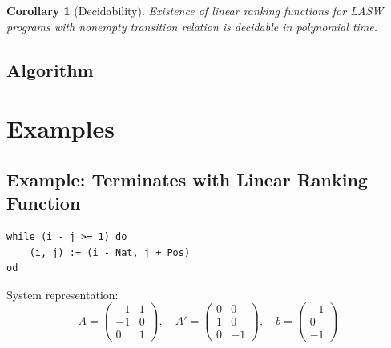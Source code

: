 \documentclass{article}
\newtheorem{corollary}{Corollary}
\begin{document}
\begin{corollary}[Decidability]
Existence of linear ranking functions for LASW programs with nonempty transition relation is decidable in polynomial time.
\end{corollary}

\subsection{Algorithm}

\begin{figure}[h]
\centering
{}
\end{figure}

\section{Examples}

\subsection{Example: Terminates with Linear Ranking Function}

\begin{verbatim}
while (i - j >= 1) do
    (i, j) := (i - Nat, j + Pos)
od
\end{verbatim}

System representation:
\begin{equation}
A = \begin{pmatrix} -1 & 1\\ -1 & 0\\ 0 & 1 \end{pmatrix}, \quad
A' = \begin{pmatrix} 0 & 0\\ 1 & 0\\ 0 & -1 \end{pmatrix}, \quad
b = \begin{pmatrix} -1\\ 0\\ -1 \end{pmatrix}
\end{equation}
\end{document}
